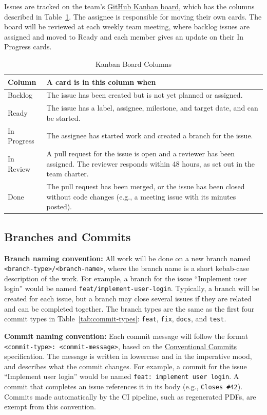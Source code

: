 \documentclass{article}
\begin{document}
Issues are tracked on the team's \href{https://github.com/users/robertLam04/projects/5}{GitHub Kanban board}, which has the columns described in Table~\ref{tab:kanban}. The assignee is responsible for moving their own cards. The board will be reviewed at each weekly team meeting, where backlog issues are assigned and moved to Ready and each member gives an update on their In Progress cards.

\begin{table}[H]
\caption{Kanban Board Columns} \label{tab:kanban}
\begin{tabularx}{\textwidth}{p{2.3cm}>{\raggedright\arraybackslash}X}
\toprule
\textbf{Column} & \textbf{A card is in this column when}\\
\midrule
Backlog & The issue has been created but is not yet planned or assigned.\\
Ready & The issue has a label, assignee, milestone, and target date, and can be started.\\
In Progress & The assignee has started work and created a branch for the issue.\\
In Review & A pull request for the issue is open and a reviewer has been assigned. The reviewer responds within 48 hours, as set out in the team charter.\\
Done & The pull request has been merged, or the issue has been closed without code changes (e.g., a meeting issue with its minutes posted).\\
\bottomrule
\end{tabularx}
\end{table}

\subsection{Branches and Commits}

\textbf{Branch naming convention:} All work will be done on a new branch named \texttt{<branch-type>/<branch-name>}, where the branch name is a short kebab-case description of the work. For example, a branch for the issue ``Implement user login'' would be named \texttt{feat/implement-user-login}. Typically, a branch will be created for each issue, but a branch may close several issues if they are related and can be completed together. The branch types are the same as the first four commit types in Table~\ref{tab:commit-types}: \texttt{feat}, \texttt{fix}, \texttt{docs}, and \texttt{test}.

\textbf{Commit naming convention:} Each commit message will follow the format \texttt{<commit-type>: <commit-message>}, based on the \href{https://www.conventionalcommits.org/en/v1.0.0/}{Conventional Commits} specification. The message is written in lowercase and in the imperative mood, and describes what the commit changes. For example, a commit for the issue ``Implement user login'' would be named \texttt{feat: implement user login}. A commit that completes an issue references it in its body (e.g., \texttt{Closes \#42}). Commits made automatically by the CI pipeline, such as regenerated PDFs, are exempt from this convention.
\end{document}
